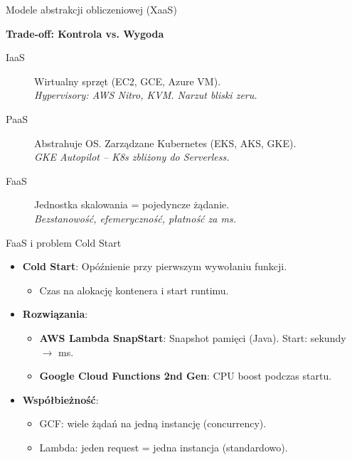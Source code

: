 \documentclass[aspectratio=169]{beamer}
\begin{document}
\begin{frame}{Modele abstrakcji obliczeniowej (XaaS)}
    \begin{center}
        \textbf{Trade-off: Kontrola vs. Wygoda}
    \end{center}
    \begin{description}
        \item[IaaS] Wirtualny sprzęt (EC2, GCE, Azure VM). \\
            \textit{Hypervisory: AWS Nitro, KVM. Narzut bliski zeru.}
        \item[PaaS] Abstrahuje OS. Zarządzane Kubernetes (EKS, AKS, GKE). \\
            \textit{GKE Autopilot – K8s zbliżony do Serverless.}
        \item[FaaS] Jednostka skalowania = pojedyncze żądanie. \\
            \textit{Bezstanowość, efemeryczność, płatność za ms.}
    \end{description}
\end{frame}

\begin{frame}{FaaS i problem Cold Start}
    \begin{itemize}
        \item \textbf{Cold Start}: Opóźnienie przy pierwszym wywołaniu funkcji.
        \begin{itemize}
            \item Czas na alokację kontenera i start runtimu.
        \end{itemize}
        \item \textbf{Rozwiązania}:
        \begin{itemize}
            \item \textbf{AWS Lambda SnapStart}: Snapshot pamięci (Java). Start: sekundy $\rightarrow$ ms.
            \item \textbf{Google Cloud Functions 2nd Gen}: CPU boost podczas startu.
        \end{itemize}
        \item \textbf{Współbieżność}:
        \begin{itemize}
            \item GCF: wiele żądań na jedną instancję (concurrency).
            \item Lambda: jeden request = jedna instancja (standardowo).
        \end{itemize}
    \end{itemize}
\end{frame}
\end{document}
